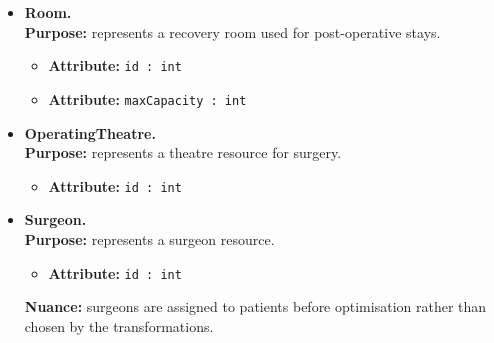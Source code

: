 \documentclass[10pt]{article}
\newcommand{\clabel}[1]{{\large\bfseries #1}}
\begin{document}
\begin{itemize}
    \item \clabel{Room.}\\
    \textbf{Purpose:} represents a recovery room used for post-operative stays.
    \begin{itemize}
        \item \textbf{Attribute:} \texttt{id : int}
        \item \textbf{Attribute:} \texttt{maxCapacity : int}
    \end{itemize}

    \item \clabel{OperatingTheatre.}\\
    \textbf{Purpose:} represents a theatre resource for surgery.
    \begin{itemize}
        \item \textbf{Attribute:} \texttt{id : int}
    \end{itemize}

    \item \clabel{Surgeon.}\\
    \textbf{Purpose:} represents a surgeon resource.
    \begin{itemize}
        \item \textbf{Attribute:} \texttt{id : int}
    \end{itemize}
    \textbf{Nuance:} surgeons are assigned to patients before optimisation rather than chosen by the transformations.
\end{itemize}
\end{document}
